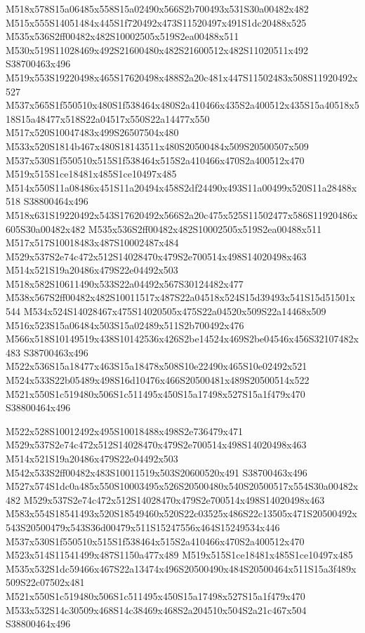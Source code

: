 \documentclass{article}
\begin{document}
\begin{multicols}{2}

M518x578S15a06485x558S15a02490x566S2b700493x531S30a00482x482 M515x555S14051484x445S1f720492x473S11520497x491S1dc20488x525 M535x536S2ff00482x482S10002505x519S2ea00488x511 M530x519S11028469x492S21600480x482S21600512x482S11020511x492 S38700463x496 M519x553S19220498x465S17620498x488S2a20c481x447S11502483x508S11920492x527 M537x565S1f550510x480S1f538464x480S2a410466x435S2a400512x435S15a40518x518S15a48477x518S22a04517x550S22a14477x550 M517x520S10047483x499S26507504x480 M533x520S1814b467x480S18143511x480S20500484x509S20500507x509 M537x530S1f550510x515S1f538464x515S2a410466x470S2a400512x470 M519x515S1ce18481x485S1ce10497x485 M514x550S11a08486x451S11a20494x458S2df24490x493S11a00499x520S11a28488x518 S38800464x496 M518x631S19220492x543S17620492x566S2a20c475x525S11502477x586S11920486x605S30a00482x482 M535x536S2ff00482x482S10002505x519S2ea00488x511 M517x517S10018483x487S10002487x484 M529x537S2e74c472x512S14028470x479S2e700514x498S14020498x463 M514x521S19a20486x479S22e04492x503 M518x582S10611490x533S22a04492x567S30124482x477 M538x567S2ff00482x482S10011517x487S22a04518x524S15d39493x541S15d51501x544 M534x524S14028467x475S14020505x475S22a04520x509S22a14468x509 M516x523S15a06484x503S15a02489x511S2b700492x476 M566x518S10149519x438S10142536x426S2be14524x469S2be04546x456S32107482x483 S38700463x496 M522x536S15a18477x463S15a18478x508S10e22490x465S10e02492x521 M524x533S22b05489x498S16d10476x466S20500481x489S20500514x522 M521x550S1c519480x506S1c511495x450S15a17498x527S15a1f479x470 S38800464x496

M522x528S10012492x495S10018488x498S2e736479x471 M529x537S2e74c472x512S14028470x479S2e700514x498S14020498x463 M514x521S19a20486x479S22e04492x503 M542x533S2ff00482x483S10011519x503S20600520x491 S38700463x496 M527x574S1dc0a485x550S10003495x526S20500480x540S20500517x554S30a00482x482 M529x537S2e74c472x512S14028470x479S2e700514x498S14020498x463 M583x554S18541493x520S18549460x520S22c03525x486S22c13505x471S20500492x543S20500479x543S36d00479x511S15247556x464S15249534x446 M537x530S1f550510x515S1f538464x515S2a410466x470S2a400512x470 M523x514S11541499x487S1150a477x489 M519x515S1ce18481x485S1ce10497x485 M535x532S1dc59466x467S22a13474x496S20500490x484S20500464x511S15a3f489x509S22c07502x481 M521x550S1c519480x506S1c511495x450S15a17498x527S15a1f479x470 M533x532S14c30509x468S14c38469x468S2a204510x504S2a21c467x504 S38800464x496


\end{multicols}
\end{document}
